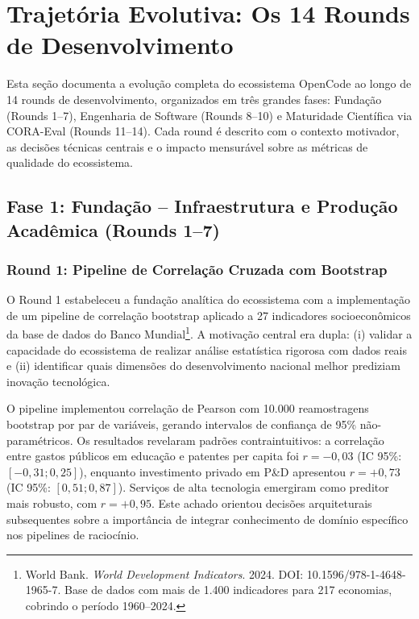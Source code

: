 
\section{Trajetória Evolutiva: Os 14 Rounds de Desenvolvimento}

Esta seção documenta a evolução completa do ecossistema OpenCode ao longo
de 14 rounds de desenvolvimento, organizados em três grandes fases:
Fundação (Rounds 1--7), Engenharia de Software (Rounds 8--10) e Maturidade
Científica via CORA-Eval (Rounds 11--14). Cada round é descrito com o
contexto motivador, as decisões técnicas centrais e o impacto mensurável
sobre as métricas de qualidade do ecossistema.

\subsection{Fase 1: Fundação -- Infraestrutura e Produção Acadêmica (Rounds 1--7)}

\subsubsection{Round 1: Pipeline de Correlação Cruzada com Bootstrap}

O Round 1 estabeleceu a fundação analítica do ecossistema com a
implementação de um pipeline de correlação bootstrap aplicado a 27
indicadores socioeconômicos da base de dados do Banco
Mundial\footnote{World Bank. \textit{World Development Indicators}. 2024.
DOI: 10.1596/978-1-4648-1965-7. Base de dados com mais de 1.400
indicadores para 217 economias, cobrindo o período 1960--2024.}. A
motivação central era dupla: (i) validar a capacidade do ecossistema de
realizar análise estatística rigorosa com dados reais e (ii) identificar
quais dimensões do desenvolvimento nacional melhor prediziam inovação
tecnológica.

O pipeline implementou correlação de Pearson com 10.000 reamostragens
bootstrap por par de variáveis, gerando intervalos de confiança de 95\%
não-paramétricos. Os resultados revelaram padrões contraintuitivos: a
correlação entre gastos públicos em educação e patentes per capita foi
$r = -0{,}03$ (IC 95\%: $[-0{,}31; 0{,}25]$), enquanto investimento
privado em P\&D apresentou $r = +0{,}73$ (IC 95\%: $[0{,}51; 0{,}87]$).
Serviços de alta tecnologia emergiram como preditor mais robusto, com
$r = +0{,}95$. Este achado orientou decisões arquiteturais subsequentes
sobre a importância de integrar conhecimento de domínio específico nos
pipelines de raciocínio.

